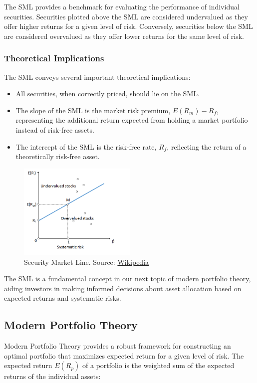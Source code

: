 The SML provides a benchmark for evaluating the performance of individual securities. Securities plotted above the SML are considered undervalued as they offer higher returns for a given level of risk. Conversely, securities below the SML are considered overvalued as they offer lower returns for the same level of risk.

\subsubsection{Theoretical Implications}
The SML conveys several important theoretical implications:
\begin{itemize}
    \item All securities, when correctly priced, should lie on the SML.
    \item The slope of the SML is the market risk premium, \( E(R_m) - R_f \), representing the additional return expected from holding a market portfolio instead of risk-free assets.
    \item The intercept of the SML is the risk-free rate, \( R_f \), reflecting the return of a theoretically risk-free asset.
\end{itemize}

\begin{figure}[h]
\centering
\includegraphics[width=0.5\textwidth]{SML.png} 
\caption{Security Market Line. Source: \href{https://en.wikipedia.org/wiki/Security_market_line}{Wikipedia}}
\label{fig:sml}
\end{figure}

The SML is a fundamental concept in our next topic of modern portfolio theory, aiding investors in making informed decisions about asset allocation based on expected returns and systematic risks.

\subsection{Modern Portfolio Theory}
Modern Portfolio Theory provides a robust framework for constructing an optimal portfolio that maximizes expected return for a given level of risk. The expected return \( E(R_p) \) of a portfolio is the weighted sum of the expected returns of the individual assets:

